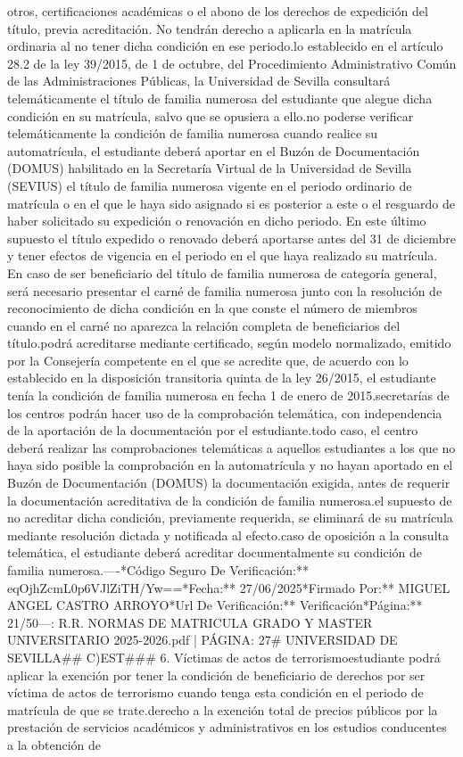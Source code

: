 \documentclass{article}
\begin{document}
\begin{itemize}
{otros, certificaciones académicas o el abono de los derechos de expedición del título, previa acreditación. No tendrán derecho a aplicarla en la matrícula ordinaria al no tener dicha condición en ese periodo.\n\nConforme lo establecido en el artículo 28.2 de la ley 39/2015, de 1 de octubre, del Procedimiento Administrativo Común de las Administraciones Públicas, la Universidad de Sevilla consultará telemáticamente el título de familia numerosa del estudiante que alegue dicha condición en su matrícula, salvo que se opusiera a ello.\n\nDe no poderse verificar telemáticamente la condición de familia numerosa cuando realice su automatrícula, el estudiante deberá aportar en el Buzón de Documentación (DOMUS) habilitado en la Secretaría Virtual de la Universidad de Sevilla (SEVIUS) el título de familia numerosa vigente en el periodo ordinario de matrícula o en el que le haya sido asignado si es posterior a este o el resguardo de haber solicitado su expedición o renovación en dicho periodo. En este último supuesto el título expedido o renovado deberá aportarse antes del 31 de diciembre y tener efectos de vigencia en el periodo en el que haya realizado su matrícula. En caso de ser beneficiario del título de familia numerosa de categoría general, será necesario presentar el carné de familia numerosa junto con la resolución de reconocimiento de dicha condición en la que conste el número de miembros cuando en el carné no aparezca la relación completa de beneficiarios del título.\n{} podrá acreditarse mediante certificado, según modelo normalizado, emitido por la Consejería competente en el que se acredite que, de acuerdo con lo establecido en la disposición transitoria quinta de la ley 26/2015, el estudiante tenía la condición de familia numerosa en fecha 1 de enero de 2015.\n\nLas secretarías de los centros podrán hacer uso de la comprobación telemática, con independencia de la aportación de la documentación por el estudiante.\n\nEn todo caso, el centro deberá realizar las comprobaciones telemáticas a aquellos estudiantes a los que no haya sido posible la comprobación en la automatrícula y no hayan aportado en el Buzón de Documentación (DOMUS) la documentación exigida, antes de requerir la documentación acreditativa de la condición de familia numerosa.\n\nEn el supuesto de no acreditar dicha condición, previamente requerida, se eliminará de su matrícula mediante resolución dictada y notificada al efecto.\n\nEn caso de oposición a la consulta telemática, el estudiante deberá acreditar documentalmente su condición de familia numerosa.\n\n----\n\n**Código Seguro De Verificación:** eqOjhZcmL0p6VJlZiTH/Yw==\n**Fecha:** 27/06/2025\n**Firmado Por:** MIGUEL ANGEL CASTRO ARROYO\n**Url De Verificación:** Verificación\n**Página:** 21/50\n\n---\n\nFUENTE: R.R. NORMAS DE MATRICULA GRADO Y MASTER UNIVERSITARIO 2025-2026.pdf | PÁGINA: 27\n# UNIVERSIDAD DE SEVILLA\n\n## C)EST\n\n### 6. Víctimas de actos de terrorismo\nEl estudiante podrá aplicar la exención por tener la condición de beneficiario de derechos por ser víctima de actos de terrorismo cuando tenga esta condición en el periodo de matrícula de que se trate.\n{} derecho a la exención total de precios públicos por la prestación de servicios académicos y administrativos en los estudios conducentes a la obtención de }
\end{itemize}
\end{document}
